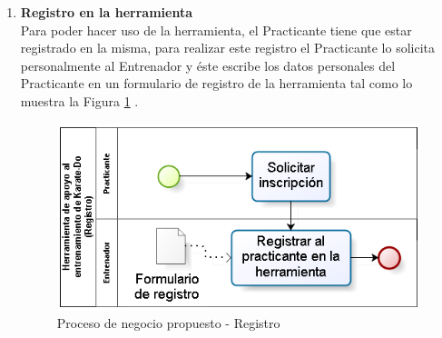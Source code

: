 \begin{enumerate}
	\item \textbf{Registro en la herramienta}\\
	Para poder hacer uso de la herramienta, el Practicante tiene que estar registrado en la misma, para realizar este registro el Practicante lo solicita personalmente al Entrenador y éste escribe los datos personales del Practicante en un formulario de registro de la herramienta tal como lo muestra la Figura \ref{fig:PN_Propuesto_Registro} .\\
	
	\begin{figure}[H]
		\begin{center}
			\includegraphics[scale=0.7]{./Figuras/Negocio/Proceso_de_Negocio_propuesto_registro}
		\end{center}
		\caption{Proceso de negocio propuesto - Registro}
		\label{fig:PN_Propuesto_Registro}
	\end{figure}


\end{enumerate}
